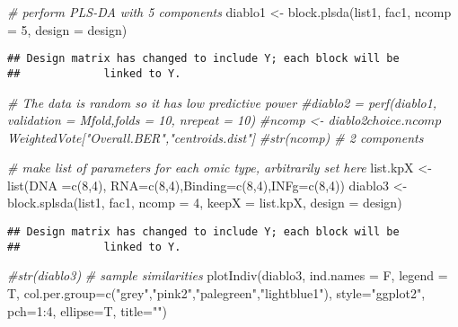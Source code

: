\documentclass[
]{article}
\newenvironment{Shaded}{\begin{snugshade}}{\end{snugshade}}
\newcommand{\AttributeTok}[1]{\textcolor[rgb]{0.77,0.63,0.00}{#1}}
\newcommand{\CommentTok}[1]{\textcolor[rgb]{0.56,0.35,0.01}{\textit{#1}}}
\newcommand{\DecValTok}[1]{\textcolor[rgb]{0.00,0.00,0.81}{#1}}
\newcommand{\FunctionTok}[1]{\textcolor[rgb]{0.00,0.00,0.00}{#1}}
\newcommand{\NormalTok}[1]{#1}
\newcommand{\OtherTok}[1]{\textcolor[rgb]{0.56,0.35,0.01}{#1}}
\newcommand{\SpecialCharTok}[1]{\textcolor[rgb]{0.00,0.00,0.00}{#1}}
\newcommand{\StringTok}[1]{\textcolor[rgb]{0.31,0.60,0.02}{#1}}
\begin{document}
\begin{Shaded}
\begin{Highlighting}[]
\CommentTok{\# perform PLS{-}DA with 5 components}
\NormalTok{diablo1 }\OtherTok{\textless{}{-}} \FunctionTok{block.plsda}\NormalTok{(list1, fac1, }\AttributeTok{ncomp =} \DecValTok{5}\NormalTok{, }\AttributeTok{design =}\NormalTok{ design)}
\end{Highlighting}
\end{Shaded}

\begin{verbatim}
## Design matrix has changed to include Y; each block will be
##             linked to Y.
\end{verbatim}

\begin{Shaded}
\begin{Highlighting}[]
\CommentTok{\# The data is random so it has low predictive power }
\CommentTok{\#diablo2 = perf(diablo1, validation = \textquotesingle{}Mfold\textquotesingle{},folds = 10, nrepeat = 10)}
\CommentTok{\#ncomp \textless{}{-} diablo2$choice.ncomp$WeightedVote["Overall.BER","centroids.dist"]}
\CommentTok{\#str(ncomp) \# 2 components}

\CommentTok{\# make list of parameters for each omic type, arbitrarily set here}
\NormalTok{list.kpX }\OtherTok{\textless{}{-}} \FunctionTok{list}\NormalTok{(}\AttributeTok{DNA =}\FunctionTok{c}\NormalTok{(}\DecValTok{8}\NormalTok{,}\DecValTok{4}\NormalTok{), }\AttributeTok{RNA=}\FunctionTok{c}\NormalTok{(}\DecValTok{8}\NormalTok{,}\DecValTok{4}\NormalTok{),}\AttributeTok{Binding=}\FunctionTok{c}\NormalTok{(}\DecValTok{8}\NormalTok{,}\DecValTok{4}\NormalTok{),}\AttributeTok{INFg=}\FunctionTok{c}\NormalTok{(}\DecValTok{8}\NormalTok{,}\DecValTok{4}\NormalTok{))}
\NormalTok{diablo3 }\OtherTok{\textless{}{-}} \FunctionTok{block.splsda}\NormalTok{(list1, fac1, }\AttributeTok{ncomp =} \DecValTok{4}\NormalTok{, }
                            \AttributeTok{keepX =}\NormalTok{ list.kpX, }\AttributeTok{design =}\NormalTok{ design)}
\end{Highlighting}
\end{Shaded}

\begin{verbatim}
## Design matrix has changed to include Y; each block will be
##             linked to Y.
\end{verbatim}

\begin{Shaded}
\begin{Highlighting}[]
\CommentTok{\#str(diablo3)}
\CommentTok{\# sample similarities}
\FunctionTok{plotIndiv}\NormalTok{(diablo3, }\AttributeTok{ind.names =}\NormalTok{ F, }\AttributeTok{legend =}\NormalTok{ T,}
        \AttributeTok{col.per.group=}\FunctionTok{c}\NormalTok{(}\StringTok{"grey"}\NormalTok{,}\StringTok{"pink2"}\NormalTok{,}\StringTok{"palegreen"}\NormalTok{,}\StringTok{"lightblue1"}\NormalTok{),}
        \AttributeTok{style=}\StringTok{"ggplot2"}\NormalTok{, }\AttributeTok{pch=}\DecValTok{1}\SpecialCharTok{:}\DecValTok{4}\NormalTok{,  }\AttributeTok{ellipse=}\NormalTok{T, }\AttributeTok{title=}\StringTok{""}\NormalTok{)}
\end{Highlighting}
\end{Shaded}
\end{document}
